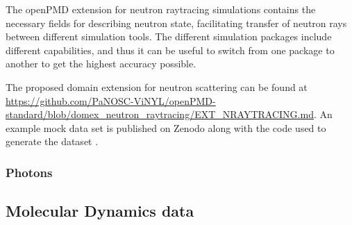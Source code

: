\documentclass[11pt, a4paper]{article}
\begin{document}
The openPMD extension for neutron raytracing simulations contains the necessary fields for describing neutron state, 
facilitating transfer of neutron rays between different simulation tools. The different simulation packages include different 
capabilities, and thus it can be useful to switch from one package to another to get the highest accuracy possible.

The proposed domain extension for neutron scattering can be found at \url{https://github.com/PaNOSC-ViNYL/openPMD-standard/blob/domex_neutron_raytracing/EXT_NRAYTRACING.md}.
An example mock data set is published on Zenodo along with the code used to generate the dataset \cite{Bertelsen:zenodo2019}.

\subsubsection{Photons}
\subsection{Molecular Dynamics data}
\printbibliography
\end{document}
